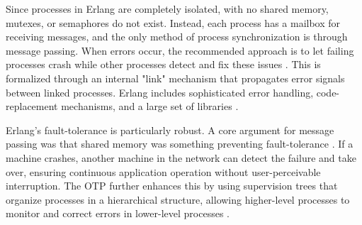 \documentclass[]{final}
\begin{document}
Since processes in Erlang are completely isolated, with no shared memory, mutexes,
or semaphores do not exist. Instead, each process has a mailbox for receiving messages,
and the only method of process synchronization is through message passing.
When errors occur, the recommended approach is to let failing processes
crash while other processes detect and fix these issues \cite{armstrong_erlang_2010}.
This is formalized
through an internal "link" mechanism that propagates error signals between
linked processes. Erlang includes sophisticated error handling, code-replacement
mechanisms, and a large set of libraries \cite{armstrong_erlang_2010}.

\label{faultErlang}

Erlang's fault-tolerance is particularly robust.
A core argument for message passing was that shared memory was something
preventing fault-tolerance \cite{armstrong_erlang_2010}.
If a machine crashes, another
machine in the network can detect the failure and take over, ensuring continuous
application operation without user-perceivable interruption. The OTP further
enhances this by using supervision trees that
organize processes in a hierarchical structure, allowing higher-level processes
to monitor and correct errors in lower-level processes \cite{armstrong_erlang_2010}.
\end{document}
